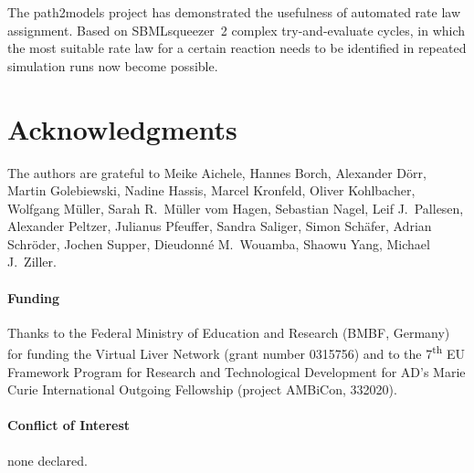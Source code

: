 \documentclass{bioinfo}
\begin{document}
The path2models project \citep{Buechel2013} has demonstrated the usefulness of automated rate law assignment.
Based on SBMLsqueezer~2
complex try-and-evaluate cycles, in which the most suitable rate law for a certain reaction needs to be identified in repeated simulation runs \citep{Draeger2011} now become possible.

\vspace{-.2cm}
\section*{Acknowledgments}

The authors are grateful to Meike Aichele, Hannes Borch, Alexander D\"orr, Martin Golebiewski, Nadine Hassis, Marcel Kronfeld, Oliver Kohlbacher, Wolfgang M\"uller, Sarah R.~M\"uller vom Hagen, Sebastian Nagel, Leif J.~Pallesen, Alexander Peltzer, Julianus Pfeuffer, Sandra Saliger, Simon Sch\"afer, Adrian Schr\"oder, Jochen Supper, Dieudonn\'e M.~Wouamba, Shaowu Yang, Michael J.~Ziller.

\paragraph{Funding\textcolon}
Thanks to the Federal Ministry of Education and Research (BMBF, Germany) for funding the
Virtual Liver Network (grant number 0315756) and to %
the 7\textsuperscript{th} EU Framework Program for Research and Technological Development
for AD's Marie Curie International Outgoing Fellowship
(project AMBiCon, 332020).

\paragraph{Conflict of Interest\textcolon} none declared.
\end{document}
